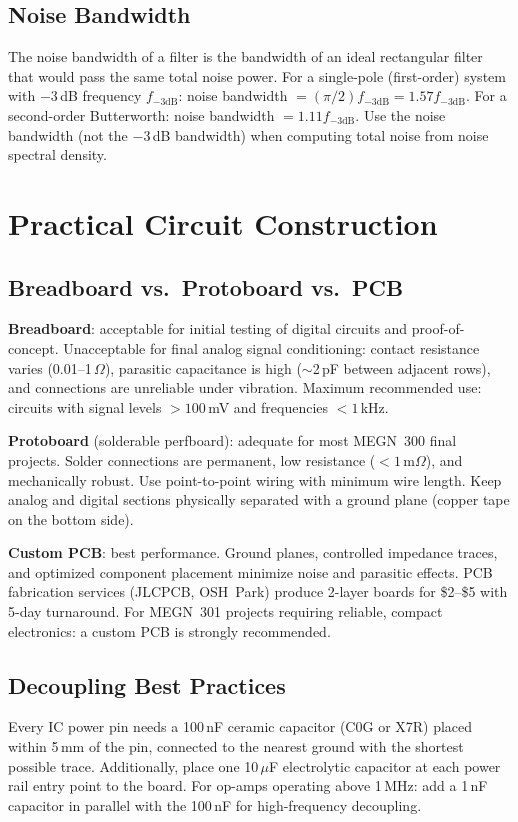 \documentclass[11pt,letterpaper,twoside,openany]{book}
\begin{document}
\subsection{Noise Bandwidth}
The noise bandwidth of a filter is the bandwidth of an ideal rectangular filter that would pass the same total noise power. For a single-pole (first-order) system with $-3$\,dB frequency $f_{-3\text{dB}}$: noise bandwidth $= (\pi/2) f_{-3\text{dB}} = 1.57 f_{-3\text{dB}}$. For a second-order Butterworth: noise bandwidth $= 1.11 f_{-3\text{dB}}$. Use the noise bandwidth (not the $-3$\,dB bandwidth) when computing total noise from noise spectral density.

\section{Practical Circuit Construction}
\subsection{Breadboard vs.\ Protoboard vs.\ PCB}
\textbf{Breadboard}: acceptable for initial testing of digital circuits and proof-of-concept. Unacceptable for final analog signal conditioning: contact resistance varies (0.01--1\,$\Omega$), parasitic capacitance is high ($\sim$2\,pF between adjacent rows), and connections are unreliable under vibration. Maximum recommended use: circuits with signal levels $> 100$\,mV and frequencies $< 1$\,kHz.

\textbf{Protoboard} (solderable perfboard): adequate for most MEGN~300 final projects. Solder connections are permanent, low resistance ($< 1$\,m$\Omega$), and mechanically robust. Use point-to-point wiring with minimum wire length. Keep analog and digital sections physically separated with a ground plane (copper tape on the bottom side).

\textbf{Custom PCB}: best performance. Ground planes, controlled impedance traces, and optimized component placement minimize noise and parasitic effects. PCB fabrication services (JLCPCB, OSH~Park) produce 2-layer boards for \$2--\$5 with 5-day turnaround. For MEGN~301 projects requiring reliable, compact electronics: a custom PCB is strongly recommended.

\subsection{Decoupling Best Practices}
Every IC power pin needs a 100\,nF ceramic capacitor (C0G or X7R) placed within 5\,mm of the pin, connected to the nearest ground with the shortest possible trace. Additionally, place one 10\,$\mu$F electrolytic capacitor at each power rail entry point to the board. For op-amps operating above 1\,MHz: add a 1\,nF capacitor in parallel with the 100\,nF for high-frequency decoupling.
\end{document}
